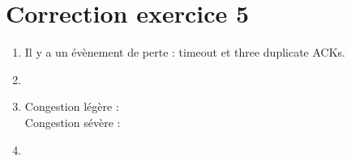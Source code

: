 \documentclass[a4paper, 11pt, titlepage]{article}
\begin{document}
\section{Correction exercice 5}
\begin{enumerate}[label=(\alph*)]
\item 
Il y a un évènement de perte : timeout et three duplicate ACKs.

\item

\item 
Congestion légère : \\

Congestion sévère : \\

\item 

\end{enumerate}
\end{document}
